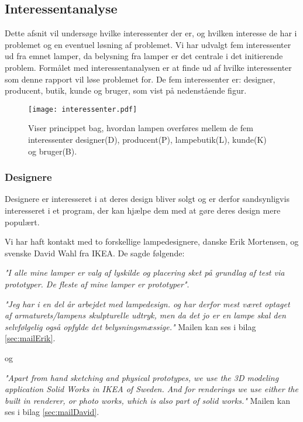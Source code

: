 \subsection{Interessentanalyse}
Dette afsnit vil undersøge hvilke interessenter der er, og hvilken interesse de har i problemet og en eventuel løsning af problemet. Vi har udvalgt fem interessenter ud fra emnet lamper, da belysning fra lamper er det centrale i det initierende problem. Formålet med interessentanalysen er at finde ud af hvilke interessenter som denne rapport vil løse problemet for. De fem interessenter er: designer, producent, butik, kunde og bruger, som vist på nedenstående figur.

\begin{figure}[H]
	\center\texttt{[image: interessenter.pdf]}
	\center\caption{Viser princippet bag, hvordan lampen overføres mellem de fem interessenter designer(D), producent(P), lampebutik(L), kunde(K) og bruger(B).}
    \label{fig:interessenter}
\end{figure}

\subsubsection{Designere}
Designere er interesseret i at deres design bliver solgt og er derfor sandsynligvis interesseret i et program, der kan hjælpe dem med at gøre deres design mere populært.

 
Vi har haft kontakt med to forskellige lampedesignere, danske Erik Mortensen, og svenske David Wahl fra IKEA. De sagde følgende:
\begin{center}
\textit{"I alle mine lamper er valg af lyskilde og placering sket på grundlag af test via prototyper. De fleste af mine lamper er prototyper"}.

\textit{"Jeg har i en del år arbejdet med lampedesign. og har derfor mest været optaget af armaturets/lampens skulpturelle udtryk, men da det jo er en lampe skal den selvfølgelig  også opfylde det belysningsmæssige."} Mailen kan ses i bilag \ref{sec:mailErik}.
\end{center}
og
\begin{center}
\textit{"Apart from hand sketching and physical prototypes, we use the 3D modeling application Solid Works in IKEA of Sweden. And for renderings we use either the built in renderer, or photo works, which is also part of solid works."} Mailen kan ses i bilag \ref{sec:mailDavid}.
\end{center}

